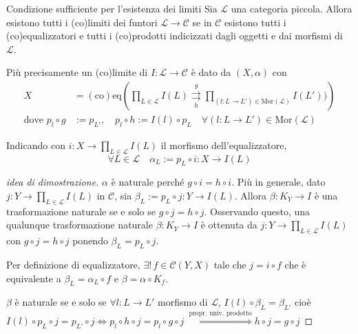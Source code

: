 \begin{theorem}{Condizione sufficiente per l'esistenza dei limiti}\label{th:suff_coeq_prod}
    Sia \(\mathcal{L}\) una categoria piccola. Allora esistono tutti i (co)limiti dei funtori \(\mathcal{L} \to \mathcal{C}\) se in \(\mathcal{C}\) esistono tutti i (co)equalizzatori e tutti i (co)prodotti indicizzati dagli oggetti e dai morfismi di \(\mathcal{L}\).

    Più precisamente un (co)limite di \(I : \mathcal{L} \to \mathcal{C}\) è dato
    da \({(X, \alpha)}\) con
    \begin{align*}
    X &= \mathrm{(co)eq}{\left( \prod_{L \in \mathcal{L}} I{(L)}
    \underset{h}{\overset{g}{\rightrightarrows}} \prod_{{(l : L \to L')} \in
\mathrm{Mor}{(\mathcal{L})}} I{(L')}) \right)} \\
    \text{dove } p_l \circ g &:= p_{L'}, \quad p_l \circ h := I{(l)} \circ p_L \quad \forall {(l : L \to L')} \in \mathrm{Mor}{(\mathcal{L})}
\end{align*}

Indicando con \(i : X \to \prod_{L \in \mathcal{L}} I{(L)}\) il morfismo
dell'equalizzatore, 
\[
  \forall L \in \mathcal{L} \quad \alpha_L := p_L \circ i : X \to I{(L)}
\]
\end{theorem}

\begin{proof}[idea di dimostrazione]
    \(\alpha\) è naturale perché \(g \circ i = h \circ i\). Più in generale,
    dato \(j : Y \to \prod_{L \in \mathcal{L}} I{(L)}\) in \(\mathcal{C}\), sia
    \(\beta_L := p_L \circ j : Y \to I{(L)}\). Allora \(\beta : K_Y \to I\) è
    una trasformazione naturale se e solo se \(g \circ j = h \circ j\).
    Osservando questo, una qualunque trasformazione naturale \(\beta : K_Y \to I\) è ottenuta da \(j : Y \to \prod_{L \in \mathcal{L}} I {(L)}\) con \(g \circ j = h \circ j\) ponendo \(\beta_L = p_L \circ j\).

    Per definizione di equalizzatore, \(\exists ! \, f \in \mathcal{C}{(Y, X)}\) tale che \(j = i \circ f\) che è equivalente a \(\beta_L = \alpha_L \circ f\) e \(\beta = \alpha \circ K_f\).

    \(\beta\) è naturale se e solo se \(\forall l : L \to L'\) morfismo di
    \(\mathcal{L}\), \(I{(l)} \circ \beta_L = \beta_{L'}\) cioè \(I{(l)} \circ p_L \circ j = p_{L'}  \circ j \iff 
    p_l \circ h \circ j = p_l \circ g \circ j \overset{\text{ propr. univ.
    prodotto}}{\iff} h \circ j = g \circ j \)
\end{proof}


